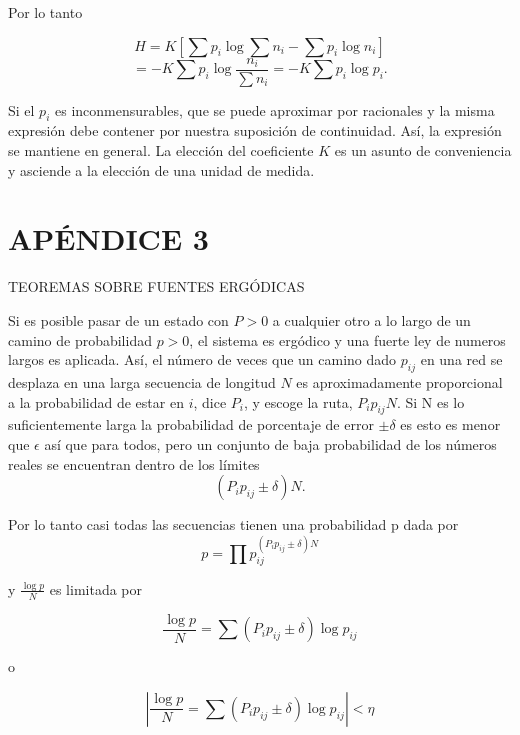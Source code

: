Por lo tanto

\begin{equation}
H=K\left[\sum p_{i}\log \sum n_{i}-\sum p_{i}\log n_{i}\right]
\end{equation}
\begin{equation}
=-K\sum p_{i}\log \frac{n_{i}}{\sum n_{i}}=-K\sum p_{i}\log p_{i}.
\end{equation}

Si el $p_{i}$ es inconmensurables, que se puede aproximar por racionales y la misma 
expresi\'on debe contener por nuestra suposici\'on de continuidad. As\'i, la expresi\'on 
se mantiene en general. La elecci\'on del coeficiente $K$ es un asunto de conveniencia y 
asciende a la elecci\'on de una unidad de medida.

\section{AP\'ENDICE 3}
TEOREMAS SOBRE FUENTES ERG\'ODICAS

Si es posible pasar de un estado con $P>0$ a cualquier otro a lo largo de un camino de 
probabilidad $p>0$, el sistema es erg\'odico y una fuerte ley de numeros largos es aplicada. 
As\'i, el n\'umero de veces que un camino dado $p_{ij}$ en una red se desplaza en una larga 
secuencia de longitud $N$ es aproximadamente proporcional a la probabilidad de estar en $i$, 
dice $P_{i}$, y escoge la ruta, $P_{i}p_{ij}N$. Si N es lo suficientemente larga la 
probabilidad de porcentaje de error $\pm\delta$ es esto es menor que $\epsilon$ as\'i que para 
todos, pero un conjunto de baja probabilidad de los n\'umeros reales se encuentran dentro de 
los l\'imites
\begin{equation}
(P_{i}p_{ij}\pm \delta)N.
\end{equation}

Por lo tanto casi todas las secuencias tienen una probabilidad p dada por
\begin{equation}
p=\prod p_{ij}^{(P_{i}p_{ij}\pm \delta)N}
\end{equation}

y $\frac{\log  p}{N}$ es limitada por

\begin{equation}
\frac{\log  p}{N} = \sum (P_{i}p_{ij}\pm \delta)\log  p_{ij}
\end{equation}

o

\begin{equation}
\left|\frac{\log  p}{N} = \sum (P_{i}p_{ij}\pm \delta)\log p_{ij}\right|<\eta
\end{equation}

